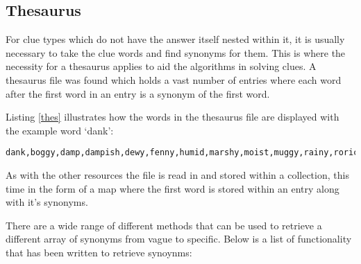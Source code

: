 \subsection{Thesaurus}

For clue types which do not have the answer itself nested within it, it is usually necessary 
to take the clue words and find synonyms for them. This is where the necessity for a thesaurus 
applies to aid the algorithms in solving clues. A thesaurus file was found which holds a vast number 
of entries where each word after the first word in an entry is a synonym of the first word. 

Listing \ref{thes} illustrates how the words in the thesaurus file are
displayed with the example word `dank':

\begin{lstlisting}[caption={A sample of the thesaurus file for the word `dank'},
                   label=thes]  
dank,boggy,damp,dampish,dewy,fenny,humid,marshy,moist,muggy,rainy,roric,roriferous,sticky,swampy,tacky,undried,wet,wettish
\end{lstlisting}

As with the other resources the file is read in and stored within a collection, this 
time in the form of a map where the first word is stored within an entry along with it's 
synonyms. 

There are a wide range of different methods that can be used to retrieve a different array 
of synonyms from vague to specific. Below is a list of functionality that has been written 
to retrieve synoynms:

